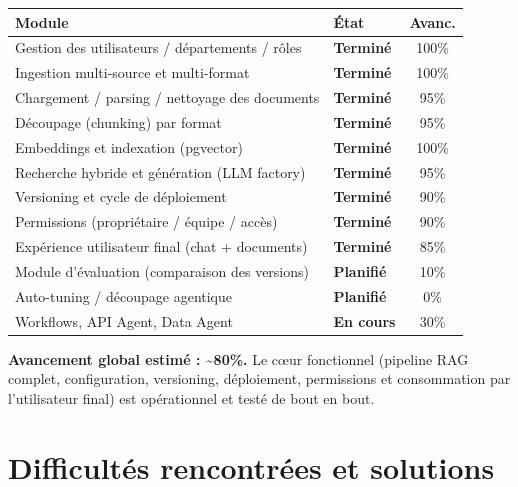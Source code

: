 \documentclass[11pt,a4paper]{article}
\newcommand{\etat}[2]{\textbf{\color{#1}#2}}
\newcommand{\fait}{\etat{ok}{Terminé}}
\newcommand{\encours}{\etat{wip}{En cours}}
\newcommand{\planifie}{\etat{plan}{Planifié}}
\begin{document}
\begin{center}
\renewcommand{\arraystretch}{1.3}
\begin{tabularx}{\linewidth}{@{}X l c@{}}
  \toprule
  \textbf{Module} & \textbf{État} & \textbf{Avanc.} \\
  \midrule
  Gestion des utilisateurs / départements / rôles       & \fait      & 100\% \\
  Ingestion multi-source et multi-format                & \fait      & 100\% \\
  Chargement / parsing / nettoyage des documents        & \fait      & 95\%  \\
  Découpage (chunking) par format                       & \fait      & 95\%  \\
  Embeddings et indexation (pgvector)                   & \fait      & 100\% \\
  Recherche hybride et génération (LLM factory)         & \fait      & 95\%  \\
  Versioning et cycle de déploiement                    & \fait      & 90\%  \\
  Permissions (propriétaire / équipe / accès)           & \fait      & 90\%  \\
  Expérience utilisateur final (chat + documents)       & \fait      & 85\%  \\
  Module d'évaluation (comparaison des versions)        & \planifie  & 10\%  \\
  Auto-tuning / découpage agentique                     & \planifie  & 0\%   \\
  Workflows, API Agent, Data Agent                      & \encours   & 30\%  \\
  \bottomrule
\end{tabularx}
\end{center}

\noindent
\textbf{Avancement global estimé : \textasciitilde 80\%.} Le cœur fonctionnel
(pipeline RAG complet, configuration, versioning, déploiement, permissions et
consommation par l'utilisateur final) est opérationnel et testé de bout en bout.

\section{Difficultés rencontrées et solutions}
\end{document}
